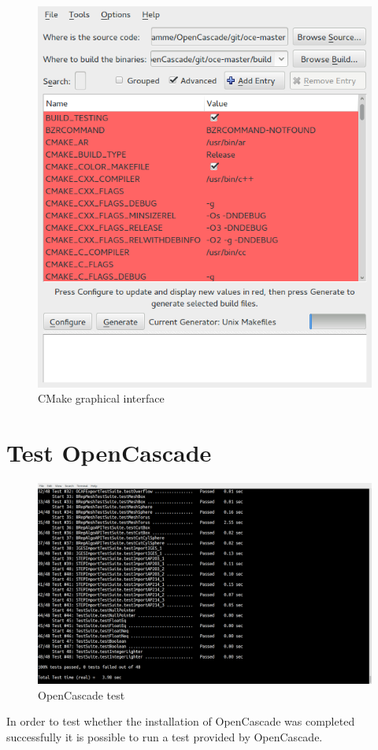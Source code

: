 \documentclass[11pt,a4paper,bibtotoc,idxtotoc,headsepline,footsepline,footexclude,DIV13,oneside]{scrbook}
\begin{document}
\begin{figure}
\centering
\includegraphics[scale=0.5]{img/CMake_GUI.png}
\caption{CMake graphical interface}
\label{fig:CMake_GUI}
\end{figure}
\section{Test OpenCascade}
\begin{figure}
\centering
\includegraphics[scale=0.2]{img/OC_Test2.png}
\caption{OpenCascade test}
\label{fig:OC_test}
\end{figure}
In order to test whether the installation of OpenCascade was completed successfully it is possible to run a test provided by OpenCascade. 
\end{document}
